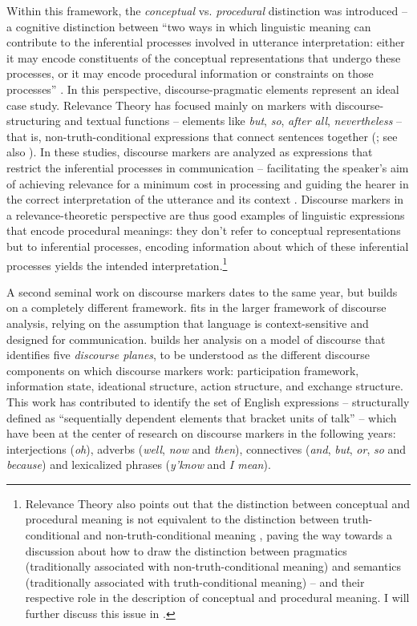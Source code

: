 Within this framework, the \textit{conceptual} vs. \textit{procedural} distinction was introduced – a cognitive distinction between “two ways in which linguistic meaning can contribute to the inferential processes involved in utterance interpretation: either it may encode constituents of the conceptual representations that undergo these processes, or it may encode procedural information or constraints on those processes” \citep[229]{Blakemore2006}. In this perspective, discourse-pragmatic elements represent an ideal case study. Relevance Theory has focused mainly on markers with discourse-structuring and textual functions – elements like \textit{but}, \textit{so}, \textit{after all}, \textit{nevertheless} – that is, non-truth-conditional expressions that connect sentences together (\citealt{Blakemore1987,Blakemore2002}; see also \citealt{JuckerZiv1998}). In these studies, discourse markers are analyzed as expressions that restrict the inferential processes in communication – facilitating the speaker’s aim of achieving relevance for a minimum cost in processing and guiding the hearer in the correct interpretation of the utterance and its context \citep[230]{Blakemore2006}. Discourse markers in a relevance-theoretic perspective are thus good examples of linguistic expressions that encode procedural meanings: they don’t refer to conceptual representations but to inferential processes, encoding information about which of these inferential processes yields the intended interpretation.\footnote{Relevance Theory also points out that the distinction between conceptual and procedural meaning is not equivalent to the distinction between truth-conditional and non-truth-conditional meaning \citep[230]{Blakemore2006}, paving the way towards a discussion about how to draw the distinction between pragmatics (traditionally associated with non-truth-conditional meaning) and semantics (traditionally associated with truth-conditional meaning) – and their respective role in the description of conceptual and procedural meaning. I will further discuss this issue in .}

A second seminal work on discourse markers dates to the same year, but builds on a completely different framework. \citet{Schiffrin1987} fits in the larger framework of discourse analysis, relying on the assumption that language is context-sensitive and designed for communication. \citet[21--29]{Schiffrin1987} builds her analysis on a model of discourse that identifies five \textit{discourse planes}, to be understood as the different discourse components on which discourse markers work: participation framework, information state, ideational structure, action structure, and exchange structure. This work has contributed to identify the set of English expressions – structurally defined as “sequentially dependent elements that bracket units of talk” \citep[31]{Schiffrin1987} – which have been at the center of research on discourse markers in the following years: interjections (\textit{oh}), adverbs (\textit{well}, \textit{now} and \textit{then}), connectives (\textit{and}, \textit{but}, \textit{or}, \textit{so} and \textit{because}) and lexicalized phrases (\textit{y’know} and \textit{I mean}).

